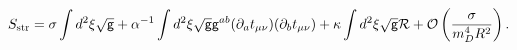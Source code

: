 \begin{equation}
\label{sstr}
S_{\rm str}=\sigma\int d^2\xi\sqrt{\sf g}+
\alpha^{-1}\int d^2\xi\sqrt{\sf g}{\sf g}^{ab}
(\partial_at_{\mu\nu})(\partial_bt_{\mu\nu})+\kappa
\int d^2\xi\sqrt{\sf g}{\cal R}+{\cal O}\left(\frac{\sigma}{m_D^4R^2}\right).
\end{equation}

